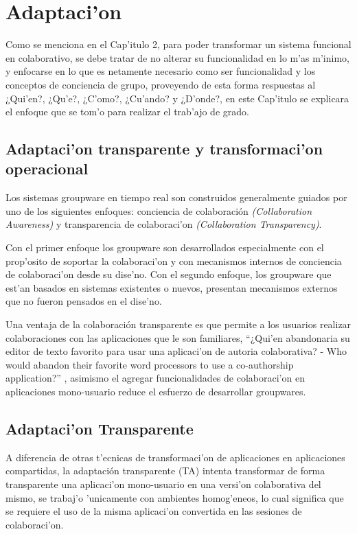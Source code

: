 \chapter{Adaptaci'on}
\label{capitulocuatro}

Como se menciona en el Cap'itulo 2, para poder transformar un sistema funcional  en colaborativo, se debe tratar de no alterar  su funcionalidad en lo m'as m'inimo, y enfocarse en lo que es netamente necesario como ser funcionalidad y los conceptos de conciencia de grupo, proveyendo de esta forma respuestas al ¿Qui'en?, ¿Qu'e?, ¿C'omo?, ¿Cu'ando? y ¿D'onde?, en este Cap'itulo se explicara el enfoque que se tom'o para realizar el trab'ajo de grado.


\section{Adaptaci'on transparente y transformaci'on operacional}

Los sistemas groupware en tiempo real son construidos generalmente guiados por uno de los siguientes enfoques: conciencia de colaboración \textit{(Collaboration Awareness)} y transparencia de colaboraci'on \textit{(Collaboration Transparency)}.

\medskip
Con el primer enfoque los groupware son desarrollados especialmente con el prop'osito de soportar la colaboraci'on y con mecanismos internos de conciencia de colaboraci'on desde su dise'no. Con el segundo enfoque, los groupware que est'an basados en sistemas existentes o nuevos, presentan mecanismos externos que no fueron pensados en el dise'no.\cite{xia2006leveraging} 

\medskip
Una ventaja de la colaboración transparente es que permite a los usuarios realizar colaboraciones con las aplicaciones que le son familiares, “¿Qui'en abandonaria su editor de texto favorito para usar una aplicaci'on de autoria colaborativa? - Who would abandon their favorite word processors to use a co-authorship application?” \cite{grudin1994groupware}, asimismo el agregar funcionalidades de colaboraci'on en aplicaciones mono-usuario reduce el esfuerzo de desarrollar groupwares.

\section{Adaptaci'on Transparente}

A diferencia de otras t'ecnicas de transformaci'on de aplicaciones en aplicaciones compartidas, la adaptación transparente (TA) intenta transformar de forma transparente una aplicaci'on mono-usuario en una versi'on colaborativa del mismo, se trabaj'o 'unicamente con ambientes homog'eneos, lo cual significa que se requiere el uso de la misma aplicaci'on convertida en las sesiones de colaboraci'on.

